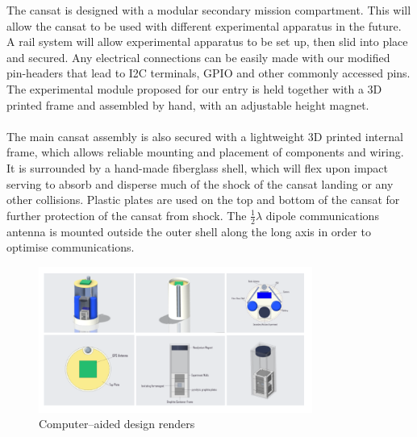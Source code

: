 \documentclass{report}
\begin{document}
		The cansat is designed with a modular secondary mission compartment. 
		This will allow the cansat to be used with different experimental apparatus 
		in the future. A rail system will allow experimental apparatus to be set up,
		then slid into place and secured. Any electrical connections can be easily
		made with our modified pin-headers that lead to I2C terminals, GPIO and
		other commonly accessed pins. The experimental module proposed for 
		our entry is held together with a 3D printed frame and assembled by 
		hand, with an adjustable height magnet.
		\\\\
		The main cansat assembly is also secured with a lightweight 3D printed
		internal frame, which allows reliable mounting and placement of components
		and wiring. It is surrounded by a hand-made fiberglass shell, which will flex
		upon impact serving to absorb and disperse much of the shock of the
		cansat landing or any other collisions. Plastic plates are used on the top and
		bottom of the cansat for further protection of the cansat from shock. The 
		$\frac{1}{2}\lambda$ dipole communications antenna is mounted outside
		the outer shell along the long axis in order to optimise communications.

		\begin{figure}[H]
			\begin{center}
				\includegraphics[width=0.8\textwidth]{CadRenders}
			\end{center}
			\vspace{-15pt}
			\caption{Computer--aided design renders}
		\end{figure}
\end{document}
